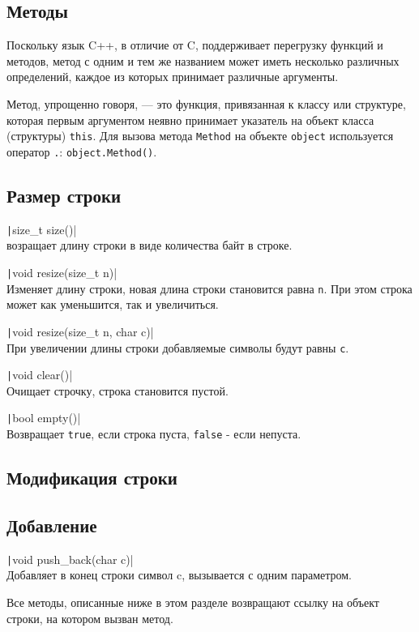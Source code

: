 \subsection{Методы}
Поскольку язык C++, в отличие от C, поддерживает перегрузку функций и методов,
метод с одним и тем же названием может иметь несколько различных определений,
каждое из которых принимает различные аргументы.

Метод, упрощенно говоря, --- это функция, привязанная к классу или структуре,
которая первым аргументом неявно принимает указатель на объект класса (структуры)
\verb|this|. Для вызова метода \verb|Method| на объекте \verb|object| используется
оператор \verb|.|: \verb|object.Method()|.


\subsection{Размер строки}
\texttt|size_t size()|\\
возращает длину строки в виде количества байт в строке.

\texttt|void resize(size_t n)| \\
Изменяет длину строки, новая длина строки становится равна \verb|n|. При этом строка может как уменьшится,
так и увеличиться.

\texttt|void resize(size_t n, char c)|\\
При увеличении длины строки добавляемые символы будут равны \verb|c|.

\texttt|void clear()|\\
Очищает строчку, строка становится пустой.

\texttt|bool empty()|\\
Возвращает \verb|true|, если строка пуста, \verb|false| - если непуста.

\subsection{Модификация строки}
\subsection*{Добавление}

\noindent
\texttt|void push_back(char c)|\\
Добавляет в конец строки символ c, вызывается с одним параметром.

\vspace{0.6cm}
Все методы, описанные ниже в этом разделе возвращают ссылку на объект строки, на
котором вызван метод.

